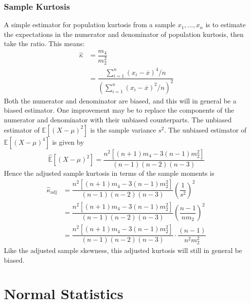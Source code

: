 \documentclass[11pt]{report} %
\begin{document}
\subsubsection{Sample Kurtosis}

A simple estimator for population kurtosis from a sample $x_{1}, \dots, x_{n}$ is to estimate the expectations in the numerator and denominator of population kurtosis, then take the ratio. This means:
\begin{align}
\hat{\kappa} &= \dfrac{m_{4}}{m_{2}^{2}} \\
&= \dfrac{\sum_{i = 1}^{n}\left(x_{i} - \overline{x}\right)^{4}/n}{\left(\sum_{i = 1}^{n}\left(x_{i} - \overline{x}\right)^{2}/n\right)^{2}}
\end{align}
Both the numerator and denominator are biased, and this will in general be a biased estimator. One improvement may be to replace the components of the numerator and denominator with their unbiased counterparts. The unbiased estimator of $\mathbb{E}\left[\left(X - \mu\right)^{2}\right]$ is the sample variance $s^{2}$. The unbiased estimator of $\mathbb{E}\left[\left(X - \mu\right)^{4}\right]$ is given by
\begin{equation}
\hat{\mathbb{E}}\left[\left(X - \mu\right)^{2}\right] = \dfrac{n^{2}\left[\left(n + 1\right)m_{4} - 3\left(n - 1\right)m_{2}^{2}\right]}{\left(n -  1\right)\left(n - 2\right)\left(n - 3\right)}
\end{equation}
Hence the adjusted sample kurtosis in terms of the sample moments is
\begin{align}
\hat{\kappa}_{\mathrm{adj}} &= \dfrac{n^{2}\left[\left(n + 1\right)m_{4} - 3\left(n - 1\right)m_{2}^{2}\right]}{\left(n -  1\right)\left(n - 2\right)\left(n - 3\right)}\left(\dfrac{1}{s^{2}}\right)^{2} \\
&= \dfrac{n^{2}\left[\left(n + 1\right)m_{4} - 3\left(n - 1\right)m_{2}^{2}\right]}{\left(n -  1\right)\left(n - 2\right)\left(n - 3\right)}\left(\dfrac{n - 1}{nm_{2}}\right)^{2} \\
&= \dfrac{n^{2}\left[\left(n + 1\right)m_{4} - 3\left(n - 1\right)m_{2}^{2}\right]}{\left(n -  1\right)\left(n - 2\right)\left(n - 3\right)}\cdot\dfrac{\left(n - 1\right)}{n^{2}m_{2}^{2}}
\end{align}
Like the adjusted sample skewness, this adjusted kurtosis will still in general be biased.

\section{Normal Statistics}
\end{document}
